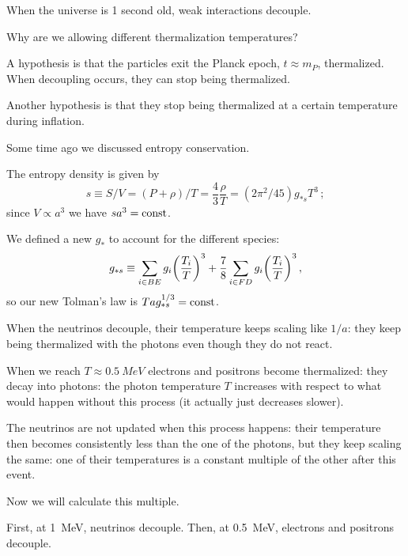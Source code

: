 \documentclass[main.tex]{subfiles}
\begin{document}
When the universe is 1 second old, weak interactions decouple.

Why are we allowing different thermalization temperatures?

A hypothesis is that the particles exit the Planck epoch, \(t \approx m_P\), thermalized.
When decoupling occurs, they can stop being thermalized.

Another hypothesis is that they stop being thermalized at a certain temperature during inflation.

Some time ago we discussed entropy conservation.

The entropy density is given by 
%
\begin{equation}
    s \equiv S/V = (P + \rho ) / T = \frac{4}{3} \frac{\rho}{T} = (2 \pi^2 / 45) g_{* s} T^{3} 
\,;
\end{equation}
%
since \(V \propto a^{3}\) we have \(s a^3 = \text{const}\).

We defined a new \(g_{*}\) to account for the different species: 
%
\begin{equation}
  g_{* s} \equiv \sum _{i \in BE} g_i \qty(\frac{T_i}{T})^3
  + \frac{7}{8} \sum _{i \in FD} g_i \qty(\frac{T_i}{T})^3
\,,
\end{equation}
%
so our new Tolman's law is \(T a g_{* s }^{1/3} = \text{const}\).

When the neutrinos decouple, their temperature keeps scaling like \(1/a\): they keep being thermalized with the photons even though they do not react.

When we reach \(T \approx \SI{0.5}{MeV}\) electrons and positrons become thermalized: they decay into photons: the photon temperature \(T\) increases with respect to what would happen without this process (it actually just decreases slower).

The neutrinos are not updated when this process happens: their temperature then becomes consistently less than the one of the photons, but they keep scaling the same: one of their temperatures is a constant multiple of the other after this event.

Now we will calculate this multiple.

First, at \SI{1}{MeV}, neutrinos decouple. Then, at \SI{0.5}{MeV}, electrons and positrons decouple.
\end{document}
